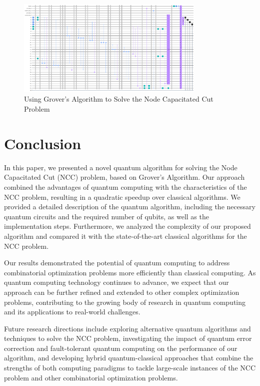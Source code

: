 \begin{figure}[htp]
    \centering
    \includegraphics[width=9cm]{Figures/Node_Capacitated_Cut_circuit.png}
    \caption{Using Grover's Algorithm to Solve the Node Capacitated Cut Problem}
    \label{fig:Node_Capacitated_Cut}
\end{figure}

\section{Conclusion} \label{sec:conclusion}

In this paper, we presented a novel quantum algorithm for solving the Node Capacitated Cut (NCC) problem, based on Grover's Algorithm. Our approach combined the advantages of quantum computing with the characteristics of the NCC problem, resulting in a quadratic speedup over classical algorithms. We provided a detailed description of the quantum algorithm, including the necessary quantum circuits and the required number of qubits, as well as the implementation steps. Furthermore, we analyzed the complexity of our proposed algorithm and compared it with the state-of-the-art classical algorithms for the NCC problem.

Our results demonstrated the potential of quantum computing to address combinatorial optimization problems more efficiently than classical computing. As quantum computing technology continues to advance, we expect that our approach can be further refined and extended to other complex optimization problems, contributing to the growing body of research in quantum computing and its applications to real-world challenges.

Future research directions include exploring alternative quantum algorithms and techniques to solve the NCC problem, investigating the impact of quantum error correction and fault-tolerant quantum computing on the performance of our algorithm, and developing hybrid quantum-classical approaches that combine the strengths of both computing paradigms to tackle large-scale instances of the NCC problem and other combinatorial optimization problems.

